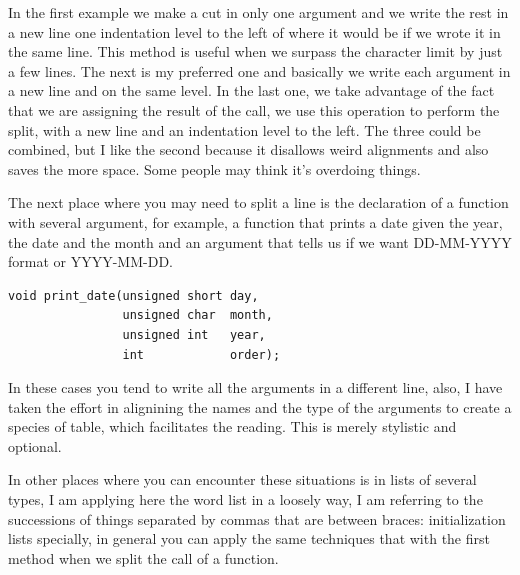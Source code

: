 \documentclass[a4paper]{article}
\begin{document}
In the first example we make a cut in only one argument and we write the rest in
a new line one indentation level to the left of where it would be if we wrote it
in the same line. This method is useful when we surpass the character limit by
just a few lines. The next is my preferred one and basically we write each
argument in a new line and on the same level. In the last one, we take advantage
of the fact that we are assigning the result of the call, we use this operation
to perform the split, with a new line and an indentation level to the left.
The three could be combined, but I like the second because it disallows weird
alignments and also saves the more space. Some people may think it's overdoing
things.

The next place where you may need to split a line is the declaration of a
function with several argument, for example, a function that prints a date given
the year, the date and the month and an argument that tells us if we want
DD-MM-YYYY format or YYYY-MM-DD.

\noindent
\begin{minipage}[H]{\linewidth}
\mbox{}
\begin{lstlisting}[style=C,
caption={Splitting of function declaration},
label={lst:functionShorting}]
void print_date(unsigned short day,
                unsigned char  month,
                unsigned int   year,
                int            order);
\end{lstlisting}
\end{minipage}

In these cases you tend to write all the arguments in a different line, also,
I have taken the effort in alignining the names and the type of the arguments to
create a species of table, which facilitates the reading. This is merely
stylistic and optional.

In other places where you can encounter these situations is in lists of several
types, I am applying here the word list in a loosely way, I am referring to the
successions of things separated by commas that are between braces:
initialization lists specially, in general you can apply the same techniques
that with the first method when we split the call of a function.
\end{document}
